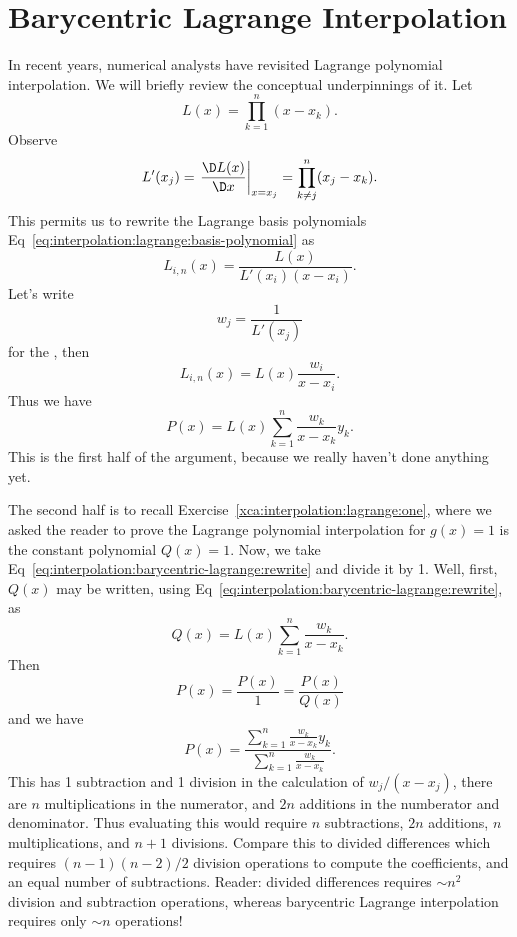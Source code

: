 \section{Barycentric Lagrange Interpolation}

In recent years, numerical analysts have revisited Lagrange polynomial
interpolation. We will briefly review the conceptual underpinnings of
it. Let
\begin{equation}
  L(x) = \prod^{n}_{k=1}(x - x_{k}).
\end{equation}
Observe
\begin{equation}
  L'(x_{j}) = \left.\frac{\D L(x)}{\D x}\right|_{x=x_{j}}
  = \prod^{n}_{k\neq j}(x_{j} - x_{k}).
\end{equation}
This permits us to rewrite the Lagrange basis polynomials Eq~\eqref{eq:interpolation:lagrange:basis-polynomial} as
\begin{equation}
  L_{i,n}(x) = \frac{L(x)}{L'(x_{i})(x - x_{i})}.
\end{equation}
Let's write
\begin{equation}
  w_{j} = \frac{1}{L'(x_{j})}
\end{equation}
for the , then
\begin{equation}
  L_{i,n}(x) = L(x)\frac{w_{i}}{x - x_{i}}.
\end{equation}
Thus we have
\begin{equation}\label{eq:interpolation:barycentric-lagrange:rewrite}
  P(x) = L(x) \sum^{n}_{k=1}\frac{w_{k}}{x - x_{k}}y_{k}.
\end{equation}
This is the first half of the argument, because we really haven't done
anything yet.

The second half is to recall
Exercise~\ref{xca:interpolation:lagrange:one},
where we asked the reader to prove the Lagrange polynomial interpolation
for $g(x)=1$ is the constant polynomial $Q(x)=1$. Now, we take
Eq~\eqref{eq:interpolation:barycentric-lagrange:rewrite}
and divide it by 1. Well, first, $Q(x)$ may be written, using
Eq~\eqref{eq:interpolation:barycentric-lagrange:rewrite}, as
\begin{equation}
  Q(x) = L(x) \sum^{n}_{k=1}\frac{w_{k}}{x - x_{k}}.
\end{equation}
Then
\begin{equation}
  P(x) = \frac{P(x)}{1} = \frac{P(x)}{Q(x)}
\end{equation}
and we have
\begin{equation}
  \boxed{P(x) = \frac{\displaystyle \sum^{n}_{k=1}\frac{w_{k}}{x - x_{k}}y_{k}}{\displaystyle\sum^{n}_{k=1}\frac{w_{k}}{x - x_{k}}}}.
\end{equation}
This has 1 subtraction and 1 division in the calculation of
$w_{j}/(x - x_{j})$, there are $n$ multiplications in the numerator, and
$2n$ additions in the numberator and denominator.
Thus evaluating this would require $n$ subtractions, $2n$ additions, $n$
multiplications, and $n+1$ divisions. Compare this to divided
differences which requires $(n-1)(n-2)/2$ division operations to compute
the coefficients, and an equal number of subtractions. Reader:
divided differences requires $\sim n^{2}$ division and subtraction
operations, whereas barycentric Lagrange interpolation requires only
$\sim n$ operations!

